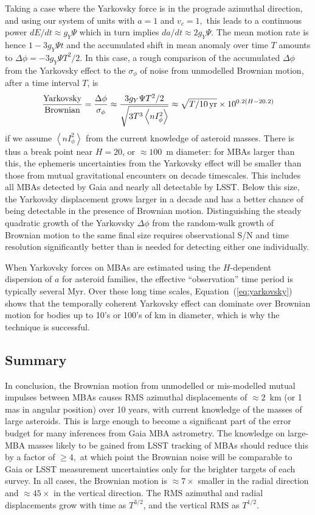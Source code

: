 \documentclass[linenumbers, onecolumn]{aastex631}
\newcommand{\eqq}[1]{Equation~(\ref{#1})}
\newcommand{\nIphi}{\left\langle nI_\phi^2\right\rangle}
\begin{document}
Taking a case where the Yarkovsky force is in the prograde azimuthal direction, and using our system of units with $a=1$ and $v_c=1,$ this leads to a continuous power $dE/dt\approx g_Y\Psi$ which in turn implies $da/dt\approx2g_Y\Psi.$   The mean motion rate is hence $1-3 g_Y\Psi t$ and the accumulated shift in mean anomaly over time $T$ amounts to $\Delta\phi = -3 g_Y \Psi  T^2/2.$   In this case, a rough comparison of the accumulated $\Delta\phi$ from the Yarkovsky effect to the $\sigma_\phi$ of noise from unmodelled Brownian motion, after a time interval $T$, is
\begin{equation}
\frac{\textrm{Yarkovsky}}{\textrm{Brownian}} = 
   \frac{\Delta\phi}{\sigma_\phi} \approx \frac{ 3 g_Y \Psi
     T^2/2}{\sqrt{3 T^3 \nIphi}} \approx \sqrt{T/10\,{\rm yr}} \times 10^{0.2(H-20.2)}
     \label{eq:yarkovsky}
\end{equation}
if we assume $\nIphi$ from the current knowledge of asteroid masses.   There is thus a break point near $H=20$, or $\approx100$~m diameter: for MBAs larger than this, the ephemeris uncertainties from the Yarkovsky effect will be smaller than those from mutual gravitational encounters on decade timescales. This includes all MBAs detected by Gaia and nearly all detectable by LSST.  Below this size, the Yarkovsky displacement grows larger in a decade and has a better chance of being detectable in the presence of Brownian motion.  Distinguishing the steady quadratic growth of the Yarkovsky $\Delta\phi$ from the random-walk growth of Brownian motion to the same final size requires observational S/N and time resolution significantly better than is needed for detecting either one individually.

When Yarkovsky forces on MBAs are estimated using the $H$-dependent
dispersion of $a$ for asteroid families, the effective ``observation''
time period is typically several Myr.  Over these long time scales,
\eqq{eq:yarkovsky} shows that the temporally coherent Yarkovsky effect
can dominate over Brownian motion for bodies up to 10's or 100's of km
in diameter, which is why the technique is successful.

\subsection{Summary}

In conclusion, the Brownian motion from unmodelled or mis-modelled
mutual impulses between MBAs causes RMS azimuthal displacements of
$\approx2$~km (or 1 mas in angular position) over 10 years, with
current knowledge of the masses of large asteroids.  This is large
enough to become a significant part of the error budget for many
inferences from Gaia MBA astrometry.  The knowledge on large-MBA
masses likely to be gained from LSST tracking of MBAs should reduce
this by a factor of $\ge4,$ at which point the Brownian noise will be
comparable to Gaia or LSST measurement uncertainties only for the
brighter targets of each survey.  In all cases, the Brownian motion is
$\approx7\times$ smaller in the radial direction and $\approx45\times$
in the vertical direction.  The RMS azimuthal and radial displacements
grow with time as $T^{3/2}$, and the vertical RMS as $T^{1/2}.$
\end{document}
